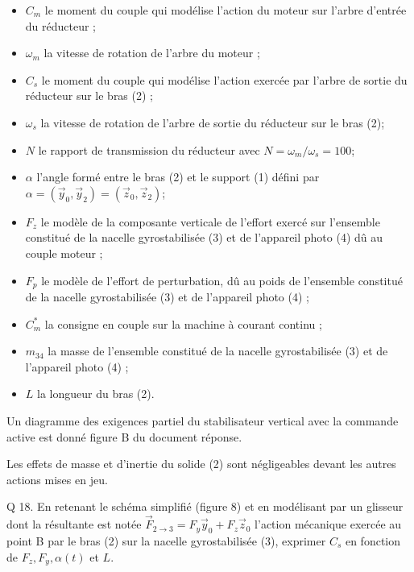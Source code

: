 \documentclass[10pt]{article}
\begin{document}
\begin{itemize}
  \item $C_{m}$ le moment du couple qui modélise l'action du moteur sur l'arbre d'entrée du réducteur ;

  \item $\omega_{m}$ la vitesse de rotation de l'arbre du moteur ;

  \item $C_{s}$ le moment du couple qui modélise l'action exercée par l'arbre de sortie du réducteur sur le bras (2) ;

  \item $\omega_{s}$ la vitesse de rotation de l'arbre de sortie du réducteur sur le bras (2);

  \item $N$ le rapport de transmission du réducteur avec $N=\omega_{m} / \omega_{s}=100$;

  \item $\alpha$ l'angle formé entre le bras (2) et le support (1) défini par $\alpha=\left(\vec{y}_{0}, \vec{y}_{2}\right)=\left(\vec{z}_{0}, \vec{z}_{2}\right)$;

  \item $F_{z}$ le modèle de la composante verticale de l'effort exercé sur l'ensemble constitué de la nacelle gyrostabilisée (3) et de l'appareil photo (4) dû au couple moteur ;

  \item $F_{p}$ le modèle de l'effort de perturbation, dû au poids de l'ensemble constitué de la nacelle gyrostabilisée (3) et de l'appareil photo (4) ;

  \item $C_{m}^{*}$ la consigne en couple sur la machine à courant continu ;

  \item $m_{34}$ la masse de l'ensemble constitué de la nacelle gyrostabilisée (3) et de l'appareil photo (4) ;

  \item $L$ la longueur du bras (2).

\end{itemize}

Un diagramme des exigences partiel du stabilisateur vertical avec la commande active est donné figure B du document réponse.

Les effets de masse et d'inertie du solide (2) sont négligeables devant les autres actions mises en jeu.

Q 18. En retenant le schéma simplifié (figure 8) et en modélisant par un glisseur dont la résultante est notée $\vec{F}_{2 \rightarrow 3}=F_{y} \vec{y}_{0}+F_{z} \vec{z}_{0}$ l'action mécanique exercée au point B par le bras (2) sur la nacelle gyrostabilisée (3), exprimer $C_{s}$ en fonction de $F_{z}, F_{y}, \alpha(t)$ et $L$.
\end{document}
